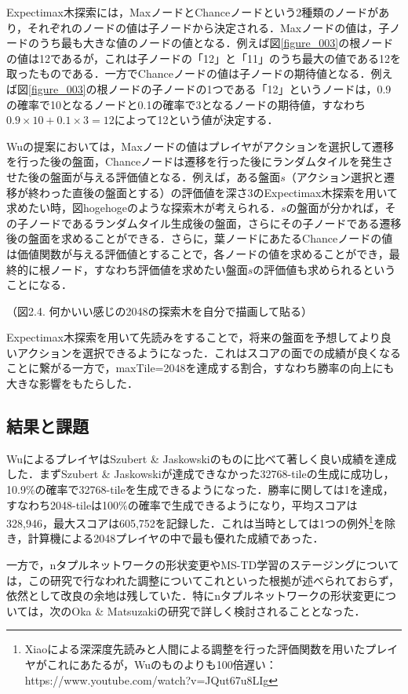\documentclass{suribt}
\begin{document}
Expectimax木探索には，MaxノードとChanceノードという2種類のノードがあり，それぞれのノードの値は子ノードから決定される．Maxノードの値は，子ノードのうち最も大きな値のノードの値となる．例えば図\ref{figure_003}の根ノードの値は12であるが，これは子ノードの「12」と「11」のうち最大の値である12を取ったものである．一方でChanceノードの値は子ノードの期待値となる．例えば図\ref{figure_003}の根ノードの子ノードの1つである「12」というノードは，0.9の確率で10となるノードと0.1の確率で3となるノードの期待値，すなわち$0.9 \times 10 + 0.1 \times 3 = 12$によって12という値が決定する．

Wuの提案においては，Maxノードの値はプレイヤがアクションを選択して遷移を行った後の盤面，Chanceノードは遷移を行った後にランダムタイルを発生させた後の盤面が与える評価値となる．例えば，ある盤面$s$（アクション選択と遷移が終わった直後の盤面とする）の評価値を深さ3のExpectimax木探索を用いて求めたい時，図hogehogeのような探索木が考えられる．$s$の盤面が分かれば，その子ノードであるランダムタイル生成後の盤面，さらにその子ノードである遷移後の盤面を求めることができる．さらに，葉ノードにあたるChanceノードの値は価値関数が与える評価値とすることで，各ノードの値を求めることができ，最終的に根ノード，すなわち評価値を求めたい盤面$s$の評価値も求められるということになる．

（図2.4. 何かいい感じの2048の探索木を自分で描画して貼る）

Expectimax木探索を用いて先読みをすることで，将来の盤面を予想してより良いアクションを選択できるようになった．これはスコアの面での成績が良くなることに繋がる一方で，maxTile=2048を達成する割合，すなわち勝率の向上にも大きな影響をもたらした．

\subsection{結果と課題}
WuによるプレイヤはSzubert \& Jaskowskiのものに比べて著しく良い成績を達成した．まずSzubert \& Jaskowskiが達成できなかった32768-tileの生成に成功し，10.9\%の確率で32768-tileを生成できるようになった．勝率に関しては1を達成，すなわち2048-tileは100\%の確率で生成できるようになり，平均スコアは328,946，最大スコアは605,752を記録した．これは当時としては1つの例外\footnote{Xiaoによる深深度先読みと人間による調整を行った評価関数を用いたプレイヤがこれにあたるが，Wuのものよりも100倍遅い：https://www.youtube.com/watch?v=JQut67u8LIg}を除き，計算機による2048プレイヤの中で最も優れた成績であった．

一方で，nタプルネットワークの形状変更やMS-TD学習のステージングについては，この研究で行なわれた調整についてこれといった根拠が述べられておらず，依然として改良の余地は残していた．特にnタプルネットワークの形状変更については，次のOka \& Matsuzakiの研究で詳しく検討されることとなった．
\end{document}
